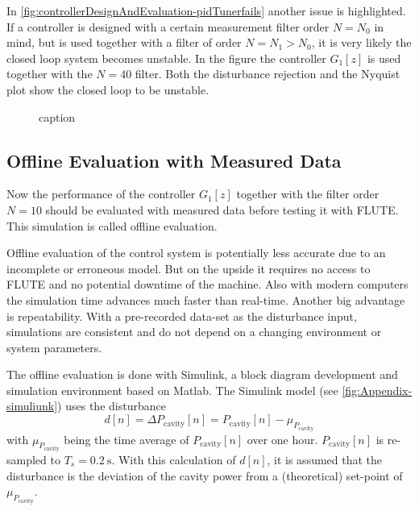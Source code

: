 In \autoref{fig:controllerDesignAndEvaluation-pidTunerfails} another issue is highlighted. If a controller is designed with a certain measurement filter order $N=N_0$ in mind, but is used together with a filter of order $N=N_1>N_0$, it is very likely the closed loop system becomes unstable. In the figure the controller $G_1[z]$ is used together with the $N=40$ filter. Both the disturbance rejection and the Nyquist plot show the closed loop to be unstable.

\begin{figure}[tb]
    \centering
        \subfloat[a]{}
        \qquad
        \subfloat[b]{}
       \caption{caption}
    \label{fig:controllerDesignAndEvaluation-pidTunerfails}
\end{figure}


\subsection{Offline Evaluation with Measured Data}
Now the performance of the controller $G_1[z]$ together with the filter order $N=10$ should be evaluated with measured data before testing it with FLUTE. This simulation is called offline evaluation.

Offline evaluation of the control system is potentially less accurate due to an incomplete or erroneous model. But on the upside it requires no access to FLUTE and no potential downtime of the machine. Also with modern computers the simulation time advances much faster than real-time. Another big advantage is repeatability. With a pre-recorded data-set as the disturbance input, simulations are consistent and do not depend on a changing environment or system parameters.

The offline evaluation is done with Simulink, a block diagram development and simulation environment based on Matlab. The Simulink model (see \autoref{fig:Appendix-simuliunk}) uses the disturbance
\begin{equation}
d[n] = \Delta P_\text{cavity}[n] = P_\text{cavity}[n] - \mu_{P_\text{cavity}}
\end{equation}
with $\mu_{P_\text{cavity}}$ being the time average of $P_\text{cavity}[n]$ over one hour. $P_\text{cavity}[n]$ is re-sampled to $T_s=\SI{0.2}{\second}$.
With this calculation of $d[n]$, it is assumed that the disturbance is the deviation of the cavity power from a (theoretical) set-point of $\mu_{P_\text{cavity}}$.

